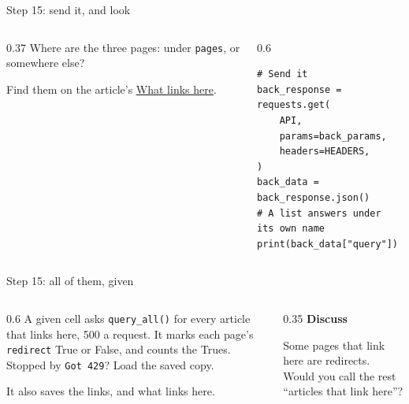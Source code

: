 \documentclass[9pt,aspectratio=169]{beamer}
\begin{document}
\begin{frame}[fragile]{Step 15: send it, and look}
    \begin{columns}[T]
        \begin{column}{0.37\textwidth}
            Where are the three pages: under \texttt{pages}, or somewhere else?

            \medskip
            Find them on the article's \href{https://en.wikipedia.org/wiki/Special:WhatLinksHere/University_of_Colorado_Boulder}{What links here}.
        \end{column}
        \begin{column}{0.6\textwidth}
\begin{lstlisting}
# Send it
back_response = requests.get(
    API,
    params=back_params,
    headers=HEADERS,
)
back_data = back_response.json()
# A list answers under its own name
print(back_data["query"])
\end{lstlisting}
        \end{column}
    \end{columns}
\end{frame}

\begin{frame}{Step 15: all of them, given}
    \begin{columns}[T]
        \begin{column}{0.6\textwidth}
            A given cell asks \texttt{query\_all()} for every article that links here, 500 a request. It marks each page's \texttt{redirect} True or False, and counts the Trues. Stopped by \texttt{Got 429}? Load the saved copy.

            \medskip
            It also saves the links, and what links here.
        \end{column}
        \begin{column}{0.35\textwidth}
            \textbf{Discuss}\\[2pt]
            {\footnotesize Some pages that link here are redirects. Would you call the rest ``articles that link here''?\par}
        \end{column}
    \end{columns}
\end{frame}
\end{document}
